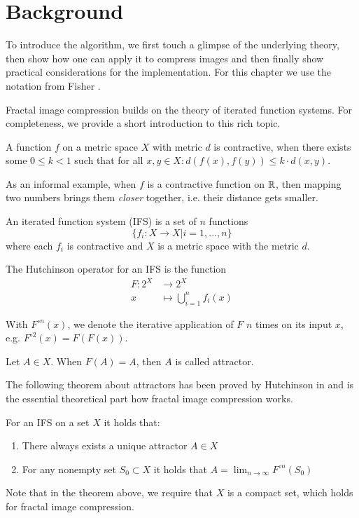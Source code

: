 \section{Background}\label{sec:background}
To introduce the algorithm, we first touch a glimpse of the underlying theory, then show how one can apply
it to compress images and then finally show practical considerations for the implementation.
For this chapter we use the notation from Fisher \cite{fisher2012}.

Fractal image compression builds on the theory of iterated function systems. For completeness,
we provide a short introduction to this rich topic.
\begin{definition}
    A function $f$ on a metric space $X$ with metric $d$ is contractive, when there exists some $0 \leq k < 1$
    such that for all $x,y \in X: d(f(x), f(y)) \leq k \cdot d(x,y)$.
\end{definition}
As an informal example, when $f$ is a contractive function on $\mathbb{R}$, then mapping two numbers brings them \textit{closer} together,
i.e. their distance gets smaller.
\begin{definition}
    An iterated function system (IFS) is a set of $n$ functions $$\{f_i:X \to X | i=1,...,n\}$$
    where each $f_i$ is contractive and $X$ is a metric space with the metric $d$.
\end{definition}
\begin{definition}
    The Hutchinson operator for an IFS is the function
    \begin{align*}
        F \colon 2^X &\to 2^X\\
        x &\mapsto \bigcup_{i=1}^n f_i(x)
    \end{align*}
\end{definition}
With $F^{\circ n}(x)$, we denote the iterative application of $F$ $n$ times on its input $x$, e.g. $F^{\circ 2}(x) = F(F(x))$.
\begin{definition}
    Let $A \in X$. When $F(A)=A$, then $A$ is called attractor.
\end{definition}
The following theorem about attractors has been proved by Hutchinson in \cite{hutchinson1981fractals} and is
the essential theoretical part how fractal image compression works.
\begin{theorem}\label{theorem-fixpoint}
    For an IFS on a set $X$ it holds that:
    \begin{enumerate}
        \item There always exists a unique attractor $A \in X$
        \item For any nonempty set $S_0 \subset X$ it holds that $A = \lim_{n \to \infty} F^{\circ n}(S_0)$
    \end{enumerate}
\end{theorem}
Note that in the theorem above, we require that $X$ is a compact set, which holds for fractal image compression.

